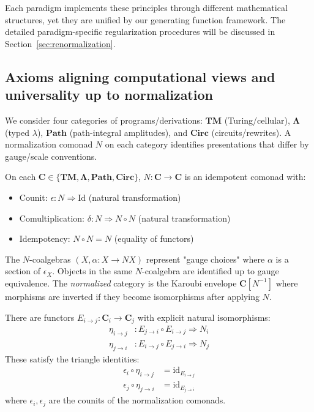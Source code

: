 Each paradigm implements these principles through different mathematical structures, yet they are unified by our generating function framework. The detailed paradigm-specific regularization procedures will be discussed in Section~\ref{sec:renormalization}.

\subsection{Axioms aligning computational views and universality up to normalization}

We consider four categories of programs/derivations:
$\mathbf{TM}$ (Turing/cellular), $\mathbf{\Lambda}$ (typed $\lambda$),
$\mathbf{Path}$ (path-integral amplitudes), and $\mathbf{Circ}$ (circuits/rewrites).
A normalization comonad $N$ on each category identifies presentations that differ by
gauge/scale conventions.

\begin{definition}[Normalization]
\label{def:normalization}
On each $\mathbf{C}\in\{\mathbf{TM},\mathbf{\Lambda},\mathbf{Path},\mathbf{Circ}\}$,
$N:\mathbf{C}\to\mathbf{C}$ is an idempotent comonad with:
\begin{itemize}
\item Counit: $\epsilon:N\Rightarrow \mathrm{Id}$ (natural transformation)
\item Comultiplication: $\delta:N\Rightarrow N\circ N$ (natural transformation)
\item Idempotency: $N\circ N = N$ (equality of functors)
\end{itemize}
The $N$-coalgebras $(X,\alpha:X\to NX)$ represent "gauge choices" where $\alpha$ is a section of $\epsilon_X$. Objects in the same $N$-coalgebra are identified up to gauge equivalence. The \emph{normalized} category is the Karoubi envelope $\mathbf{C}[N^{-1}]$ where morphisms are inverted if they become isomorphisms after applying $N$.
\end{definition}

\begin{axiom}
\label{ax:encdec}
There are functors $E_{i\to j}:\mathbf{C}_i\to\mathbf{C}_j$ with explicit natural isomorphisms:
\begin{align}
\eta_{i\to j} &: E_{j\to i}\circ E_{i\to j} \Rightarrow N_i \\
\eta_{j\to i} &: E_{i\to j}\circ E_{j\to i} \Rightarrow N_j
\end{align}
These satisfy the triangle identities:
\begin{align}
\epsilon_i \circ \eta_{i\to j} &= \mathrm{id}_{E_{i\to j}} \\
\epsilon_j \circ \eta_{j\to i} &= \mathrm{id}_{E_{j\to i}}
\end{align}
where $\epsilon_i, \epsilon_j$ are the counits of the normalization comonads.
\end{axiom}

